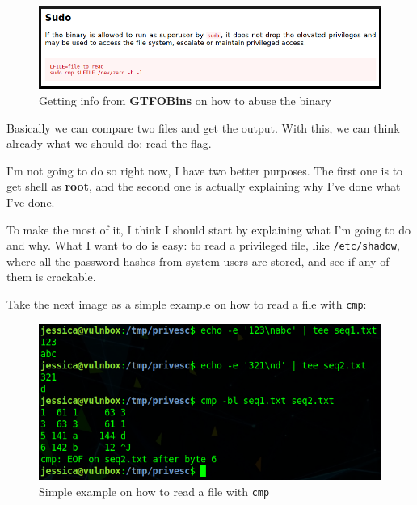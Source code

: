\documentclass[12pt]{article}
\begin{document}
    \begin{figure}[H]\label{pic:65-gtfobins-cmp}
        \centering
        \includegraphics[width=1.00\textwidth]{65-gtfobins-cmp.png}
        \caption{Getting info from \textbf{GTFOBins} on how to abuse the binary}
    \end{figure}

    Basically we can compare two files and get the output. With this, we can
    think already what we should do: read the flag.

    I'm not going to do so right now, I have two better purposes. The first one
    is to get shell as \textbf{root}, and the second one is actually explaining
    why I've done what I've done.

    To make the most of it, I think I should start by explaining what I'm going
    to do and why. What I want to do is easy: to read a privileged file, like
    \texttt{/etc/shadow}, where all the password hashes from system users are
    stored, and see if any of them is crackable.

    Take the next image as a simple example on how to read a file with
    \texttt{cmp}:

    \begin{figure}[H]\label{pic:66-cmp-demo}
        \centering
        \includegraphics[width=1.00\textwidth]{66-cmp-demo.png}
        \caption{Simple example on how to read a file with \texttt{cmp}}
    \end{figure}
\end{document}
